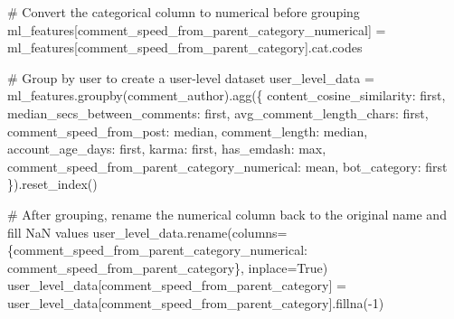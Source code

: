\documentclass[
  12pt,
  letterpaper,
  DIV=11,
  numbers=noendperiod]{scrartcl}
\newenvironment{Shaded}{\begin{snugshade}}{\end{snugshade}}
\newcommand{\CommentTok}[1]{\textcolor[rgb]{0.37,0.37,0.37}{#1}}
\newcommand{\DecValTok}[1]{\textcolor[rgb]{0.68,0.00,0.00}{#1}}
\newcommand{\NormalTok}[1]{\textcolor[rgb]{0.00,0.23,0.31}{#1}}
\newcommand{\OperatorTok}[1]{\textcolor[rgb]{0.37,0.37,0.37}{#1}}
\newcommand{\StringTok}[1]{\textcolor[rgb]{0.13,0.47,0.30}{#1}}
\newcommand{\VariableTok}[1]{\textcolor[rgb]{0.07,0.07,0.07}{#1}}
\begin{document}
\begin{Shaded}
\begin{Highlighting}[]
\CommentTok{\# Convert the categorical column to numerical before grouping}
\NormalTok{ml\_features[}\StringTok{\textquotesingle{}comment\_speed\_from\_parent\_category\_numerical\textquotesingle{}}\NormalTok{] }\OperatorTok{=}\NormalTok{ ml\_features[}\StringTok{\textquotesingle{}comment\_speed\_from\_parent\_category\textquotesingle{}}\NormalTok{].cat.codes}

\CommentTok{\# Group by user to create a user{-}level dataset}
\NormalTok{user\_level\_data }\OperatorTok{=}\NormalTok{ ml\_features.groupby(}\StringTok{\textquotesingle{}comment\_author\textquotesingle{}}\NormalTok{).agg(\{}
    \StringTok{\textquotesingle{}content\_cosine\_similarity\textquotesingle{}}\NormalTok{: }\StringTok{\textquotesingle{}first\textquotesingle{}}\NormalTok{,}
    \StringTok{\textquotesingle{}median\_secs\_between\_comments\textquotesingle{}}\NormalTok{: }\StringTok{\textquotesingle{}first\textquotesingle{}}\NormalTok{,}
    \StringTok{\textquotesingle{}avg\_comment\_length\_chars\textquotesingle{}}\NormalTok{: }\StringTok{\textquotesingle{}first\textquotesingle{}}\NormalTok{,}
    \StringTok{\textquotesingle{}comment\_speed\_from\_post\textquotesingle{}}\NormalTok{: }\StringTok{\textquotesingle{}median\textquotesingle{}}\NormalTok{,}
    \StringTok{\textquotesingle{}comment\_length\textquotesingle{}}\NormalTok{: }\StringTok{\textquotesingle{}median\textquotesingle{}}\NormalTok{,}
    \StringTok{\textquotesingle{}account\_age\_days\textquotesingle{}}\NormalTok{: }\StringTok{\textquotesingle{}first\textquotesingle{}}\NormalTok{,}
    \StringTok{\textquotesingle{}karma\textquotesingle{}}\NormalTok{: }\StringTok{\textquotesingle{}first\textquotesingle{}}\NormalTok{,}
    \StringTok{\textquotesingle{}has\_emdash\textquotesingle{}}\NormalTok{: }\StringTok{\textquotesingle{}max\textquotesingle{}}\NormalTok{,}
    \StringTok{\textquotesingle{}comment\_speed\_from\_parent\_category\_numerical\textquotesingle{}}\NormalTok{: }\StringTok{\textquotesingle{}mean\textquotesingle{}}\NormalTok{,}
    \StringTok{\textquotesingle{}bot\_category\textquotesingle{}}\NormalTok{: }\StringTok{\textquotesingle{}first\textquotesingle{}}
\NormalTok{\}).reset\_index()}

\CommentTok{\# After grouping, rename the numerical column back to the original name and fill NaN values}
\NormalTok{user\_level\_data.rename(columns}\OperatorTok{=}\NormalTok{\{}\StringTok{\textquotesingle{}comment\_speed\_from\_parent\_category\_numerical\textquotesingle{}}\NormalTok{: }\StringTok{\textquotesingle{}comment\_speed\_from\_parent\_category\textquotesingle{}}\NormalTok{\}, inplace}\OperatorTok{=}\VariableTok{True}\NormalTok{)}
\NormalTok{user\_level\_data[}\StringTok{\textquotesingle{}comment\_speed\_from\_parent\_category\textquotesingle{}}\NormalTok{] }\OperatorTok{=}\NormalTok{ user\_level\_data[}\StringTok{\textquotesingle{}comment\_speed\_from\_parent\_category\textquotesingle{}}\NormalTok{].fillna(}\OperatorTok{{-}}\DecValTok{1}\NormalTok{)}


\end{Highlighting}
\end{Shaded}
\end{document}

